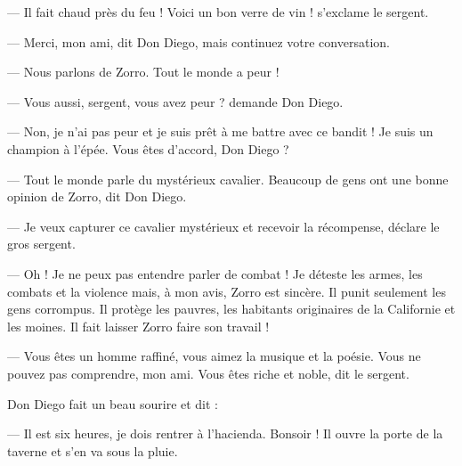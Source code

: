 --- Il fait chaud près du feu ! Voici un bon verre de vin ! s'exclame le sergent.

--- Merci, mon ami, dit Don Diego, mais continuez votre conversation.

--- Nous parlons de Zorro. Tout le monde a peur !

--- Vous aussi, sergent, vous avez peur ? demande Don Diego.

--- Non, je n'ai pas peur et je suis prêt à me battre avec ce bandit ! Je suis un champion à l'épée. Vous êtes d'accord, Don
    Diego ?

--- Tout le monde parle du mystérieux cavalier. Beaucoup de gens ont une bonne opinion de Zorro, dit Don Diego.

--- Je veux capturer ce cavalier mystérieux et recevoir la récompense, déclare le gros sergent.

--- Oh ! Je ne peux pas entendre parler de combat ! Je déteste les armes, les combats et la violence mais, à mon avis, Zorro est
    sincère. Il punit seulement les gens corrompus. Il protège les pauvres, les habitants originaires de la Californie et les
    moines. Il fait laisser Zorro faire son travail !

--- Vous êtes un homme raffiné, vous aimez la musique et la poésie. Vous ne pouvez pas comprendre, mon ami. Vous êtes riche et
    noble, dit le sergent.

Don Diego fait un beau sourire et dit :

--- Il est six heures, je dois rentrer à l'hacienda. Bonsoir ! Il ouvre la porte de la taverne et s'en va sous la pluie.
